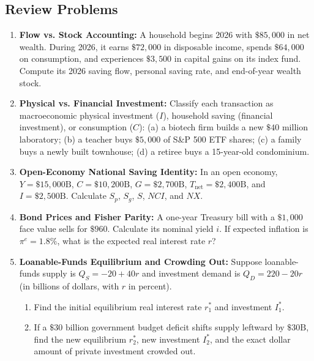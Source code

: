 \documentclass[11pt,letterpaper]{article}
\begin{document}
\subsection*{Review Problems}
\begin{enumerate}
  \item \textbf{Flow vs. Stock Accounting:} A household begins 2026 with $\$85{,}000$ in net wealth. During 2026, it earns $\$72{,}000$ in disposable income, spends $\$64{,}000$ on consumption, and experiences $\$3{,}500$ in capital gains on its index fund. Compute its 2026 saving flow, personal saving rate, and end-of-year wealth stock.
  \item \textbf{Physical vs. Financial Investment:} Classify each transaction as macroeconomic physical investment ($I$), household saving (financial investment), or consumption ($C$): (a) a biotech firm builds a new $\$40\text{ million}$ laboratory; (b) a teacher buys $\$5{,}000$ of S\&P 500 ETF shares; (c) a family buys a newly built townhouse; (d) a retiree buys a 15-year-old condominium.
  \item \textbf{Open-Economy National Saving Identity:} In an open economy, $Y = \$15{,}000\text{B}$, $C = \$10{,}200\text{B}$, $G = \$2{,}700\text{B}$, $T_{\text{net}} = \$2{,}400\text{B}$, and $I = \$2{,}500\text{B}$. Calculate $S_p$, $S_g$, $S$, $NCI$, and $NX$.
  \item \textbf{Bond Prices and Fisher Parity:} A one-year Treasury bill with a $\$1{,}000$ face value sells for $\$960$. Calculate its nominal yield $i$. If expected inflation is $\pi^e = 1.8\%$, what is the expected real interest rate $r$?
  \item \textbf{Loanable-Funds Equilibrium and Crowding Out:} Suppose loanable-funds supply is $Q_S = -20 + 40r$ and investment demand is $Q_D = 220 - 20r$ (in billions of dollars, with $r$ in percent).
    \begin{enumerate}
      \item Find the initial equilibrium real interest rate $r_1^*$ and investment $I_1^*$.
      \item If a $\$30\text{ billion}$ government budget deficit shifts supply leftward by $\$30\text{B}$, find the new equilibrium $r_2^*$, new investment $I_2^*$, and the exact dollar amount of private investment crowded out.
    \end{enumerate}
\end{enumerate}
\end{document}
